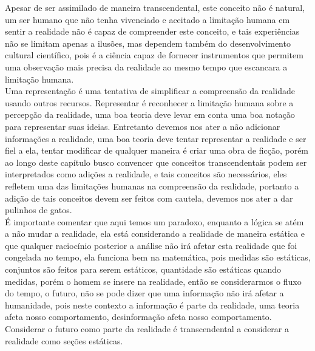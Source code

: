 \documentclass[10pt,a4paper]{report}
\begin{document}
Apesar de ser assimilado de maneira transcendental, este conceito não é natural, um ser humano que não tenha vivenciado e aceitado a limitação humana em sentir a realidade não é capaz de compreender este conceito, e tais experiências não se limitam apenas a ilusões, mas dependem também do desenvolvimento cultural científico, pois é a ciência capaz de fornecer instrumentos que permitem uma observação mais precisa da realidade ao mesmo tempo que escancara a limitação humana.\\

Uma representação é uma tentativa de simplificar a compreensão da realidade usando outros recursos. Representar é reconhecer a limitação humana sobre a percepção da realidade, uma boa teoria deve levar em conta uma boa notação para representar suas ideias. Entretanto devemos nos ater a não adicionar informações a realidade, uma boa teoria deve tentar representar a realidade e ser fiel a ela, tentar modificar de qualquer maneira é criar uma obra de ficção, porém ao longo deste capítulo busco convencer que conceitos transcendentais podem ser interpretados como adições a realidade, e tais conceitos são necessários, eles refletem uma das limitações humanas na compreensão da realidade, portanto a adição de tais conceitos devem ser feitos com cautela, devemos nos ater a dar pulinhos de gatos.\\

É importante comentar que aqui temos um paradoxo, enquanto a lógica se atém a não mudar a realidade, ela está considerando a realidade de maneira estática e que qualquer raciocínio posterior a análise não irá afetar esta realidade que foi congelada no tempo, ela funciona bem na matemática, pois medidas são estáticas, conjuntos são feitos para serem estáticos, quantidade são estáticas quando medidas, porém o homem se insere na realidade, então se considerarmos o fluxo do tempo, o futuro, não se pode dizer que uma informação não irá afetar a humanidade, pois neste contexto a informação é parte da realidade, uma teoria afeta nosso comportamento, desinformação afeta nosso comportamento. Considerar o futuro como parte da realidade é transcendental a considerar a realidade como seções estáticas.





\end{document}
